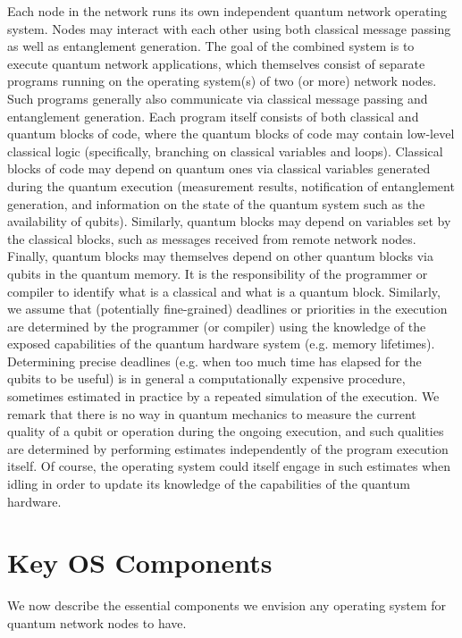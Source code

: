 Each node in the network runs its own independent quantum network operating system. Nodes may
interact with each other using both classical message passing as well as entanglement generation.
The goal of the combined system is to execute quantum network applications, which themselves consist
of separate programs running on the operating system(s) of two (or more) network nodes. Such
programs generally also communicate via classical message passing and entanglement generation. Each
program itself consists of both classical and quantum blocks of code, where the quantum blocks of
code may contain low-level classical logic (specifically, branching on classical variables and
loops). Classical blocks of code may depend on quantum ones via classical variables generated during
the quantum execution (measurement results, notification of entanglement generation, and information
on the state of the quantum system such as the availability of qubits). Similarly, quantum blocks
may depend on variables set by the classical blocks, such as messages received from remote network
nodes. Finally, quantum blocks may themselves depend on other quantum blocks via qubits in the
quantum memory. It is the responsibility of the programmer or compiler to identify what is a
classical and what is a quantum block. Similarly, we assume that (potentially fine-grained)
deadlines or priorities in the execution are determined by the programmer (or compiler) using the
knowledge of the exposed capabilities of the quantum hardware system (e.g. memory lifetimes).
Determining precise deadlines (e.g. when too much time has elapsed for the qubits to be useful) is
in general a computationally expensive procedure, sometimes estimated in practice by a repeated
simulation of the execution. We remark that there is no way in quantum mechanics to measure the
current quality of a qubit or operation during the ongoing execution, and such qualities are
determined by performing estimates independently of the program execution itself. Of course, the
operating system could itself engage in such estimates when idling in order to update its knowledge
of the capabilities of the quantum hardware.

\section{Key OS Components}
\label{sec:arch:components}

We now describe the essential components we envision any operating system for quantum network nodes
to have.

